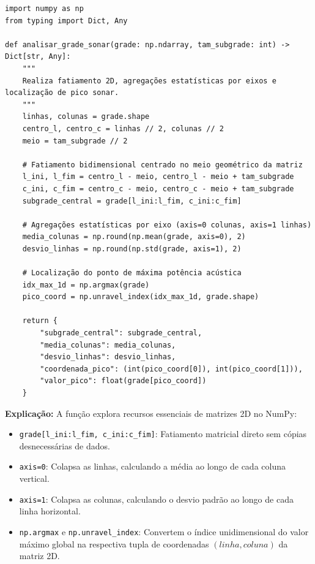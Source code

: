 \ifmostrarGabarito
\begin{verbatim}
import numpy as np
from typing import Dict, Any

def analisar_grade_sonar(grade: np.ndarray, tam_subgrade: int) -> Dict[str, Any]:
    """
    Realiza fatiamento 2D, agregações estatísticas por eixos e localização de pico sonar.
    """
    linhas, colunas = grade.shape
    centro_l, centro_c = linhas // 2, colunas // 2
    meio = tam_subgrade // 2
    
    # Fatiamento bidimensional centrado no meio geométrico da matriz
    l_ini, l_fim = centro_l - meio, centro_l - meio + tam_subgrade
    c_ini, c_fim = centro_c - meio, centro_c - meio + tam_subgrade
    subgrade_central = grade[l_ini:l_fim, c_ini:c_fim]
    
    # Agregações estatísticas por eixo (axis=0 colunas, axis=1 linhas)
    media_colunas = np.round(np.mean(grade, axis=0), 2)
    desvio_linhas = np.round(np.std(grade, axis=1), 2)
    
    # Localização do ponto de máxima potência acústica
    idx_max_1d = np.argmax(grade)
    pico_coord = np.unravel_index(idx_max_1d, grade.shape)
    
    return {
        "subgrade_central": subgrade_central,
        "media_colunas": media_colunas,
        "desvio_linhas": desvio_linhas,
        "coordenada_pico": (int(pico_coord[0]), int(pico_coord[1])),
        "valor_pico": float(grade[pico_coord])
    }
\end{verbatim}

\textbf{Explicação:}
A função explora recursos essenciais de matrizes 2D no NumPy:
\begin{itemize}[leftmargin=*]
    \item \texttt{grade[l\_ini:l\_fim, c\_ini:c\_fim]}: Fatiamento matricial direto sem cópias desnecessárias de dados.
    \item \texttt{axis=0}: Colapsa as linhas, calculando a média ao longo de cada coluna vertical.
    \item \texttt{axis=1}: Colapsa as colunas, calculando o desvio padrão ao longo de cada linha horizontal.
    \item \texttt{np.argmax} e \texttt{np.unravel\_index}: Convertem o índice unidimensional do valor máximo global na respectiva tupla de coordenadas $(linha, coluna)$ da matriz 2D.
\end{itemize}
\fi
